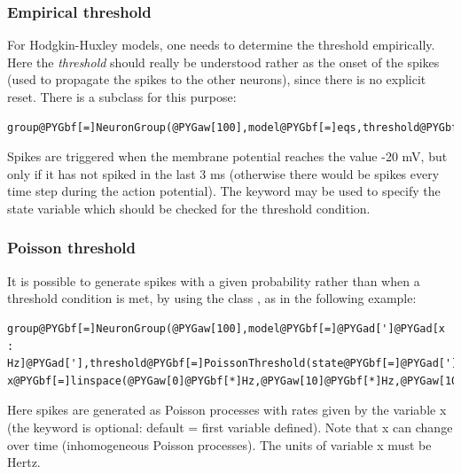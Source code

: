 \documentclass[letterpaper,10pt,english]{manual}
\begin{document}
\subsubsection{Empirical threshold}

For Hodgkin-Huxley models, one needs to determine the threshold empirically. Here the
\emph{threshold} should really be understood rather as the onset of the spikes (used to propagate
the spikes to the other neurons), since there is no explicit reset. There is a
\hyperlink{brian.Threshold}{} subclass for this purpose:

\begin{Verbatim}[commandchars=@\[\]]
group@PYGbf[=]NeuronGroup(@PYGaw[100],model@PYGbf[=]eqs,threshold@PYGbf[=]EmpiricalThreshold(threshold@PYGbf[=]@PYGbf[-]@PYGaw[20]@PYGbf[*]mV,refractory@PYGbf[=]@PYGaw[3]@PYGbf[*]ms))
\end{Verbatim}

Spikes are triggered when the membrane potential reaches the value -20 mV, but only if it
has not spiked in the last 3 ms (otherwise there would be spikes every time step during the action
potential). The  keyword may be used to specify the state variable which should be checked
for the threshold condition.


\subsubsection{Poisson threshold}

It is possible to generate spikes with a given probability rather than when a threshold condition
is met, by using the class , as in the following example:

\begin{Verbatim}[commandchars=@\[\]]
group@PYGbf[=]NeuronGroup(@PYGaw[100],model@PYGbf[=]@PYGad[']@PYGad[x : Hz]@PYGad['],threshold@PYGbf[=]PoissonThreshold(state@PYGbf[=]@PYGad[']@PYGad[x]@PYGad[']))
x@PYGbf[=]linspace(@PYGaw[0]@PYGbf[*]Hz,@PYGaw[10]@PYGbf[*]Hz,@PYGaw[100])
\end{Verbatim}

Here spikes are generated as Poisson processes with rates given by the variable x
(the  keyword is optional: default = first variable defined). Note that x can
change over time (inhomogeneous Poisson processes). The units of variable x must be Hertz.

\resetcurrentobjects
\hypertarget{--doc-connections}{}
\end{document}
